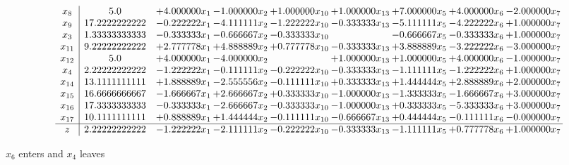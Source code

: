 \documentclass[10pt]{article}
\begin{document}
 \[\begin{array}{c| c c@{\hskip 2pt} c@{\hskip 2pt} c@{\hskip 2pt} c@{\hskip 2pt} c@{\hskip 2pt} c@{\hskip 2pt} c@{\hskip 2pt} }
 x_{8}   &  5.0 & + 4.000000 x_{1} & -1.000000 x_{2} & + 1.000000 x_{10} & + 1.000000 x_{13} & + 7.000000 x_{5} & + 4.000000 x_{6} & -2.000000 x_{7}\\
 x_{9}   &  17.2222222222 & -0.222222 x_{1} & -4.111111 x_{2} & -1.222222 x_{10} & -0.333333 x_{13} & -5.111111 x_{5} & -4.222222 x_{6} & + 1.000000 x_{7}\\
 x_{3}   &  1.33333333333 & -0.333333 x_{1} & -0.666667 x_{2} & -0.333333 x_{10} &   & -0.666667 x_{5} & -0.333333 x_{6} & + 1.000000 x_{7}\\
 x_{11}   &  9.22222222222 & + 2.777778 x_{1} & + 4.888889 x_{2} & + 0.777778 x_{10} & -0.333333 x_{13} & + 3.888889 x_{5} & -3.222222 x_{6} & -3.000000 x_{7}\\
 x_{12}   &  5.0 & + 4.000000 x_{1} & -4.000000 x_{2} &   & + 1.000000 x_{13} & + 1.000000 x_{5} & + 4.000000 x_{6} & -1.000000 x_{7}\\
 x_{4}   &  2.22222222222 & -1.222222 x_{1} & -0.111111 x_{2} & -0.222222 x_{10} & -0.333333 x_{13} & -1.111111 x_{5} & -1.222222 x_{6} & + 1.000000 x_{7}\\
 x_{14}   &  13.1111111111 & + 1.888889 x_{1} & -2.555556 x_{2} & -0.111111 x_{10} & + 0.333333 x_{13} & + 1.444444 x_{5} & + 2.888889 x_{6} & + 2.000000 x_{7}\\
 x_{15}   &  16.6666666667 & -1.666667 x_{1} & + 2.666667 x_{2} & + 0.333333 x_{10} & -1.000000 x_{13} & -1.333333 x_{5} & -1.666667 x_{6} & + 3.000000 x_{7}\\
 x_{16}   &  17.3333333333 & -0.333333 x_{1} & -2.666667 x_{2} & -0.333333 x_{10} & -1.000000 x_{13} & + 0.333333 x_{5} & -5.333333 x_{6} & + 3.000000 x_{7}\\
 x_{17}   &  10.1111111111 & + 0.888889 x_{1} & + 1.444444 x_{2} & -0.111111 x_{10} & -0.666667 x_{13} & + 0.444444 x_{5} & -0.111111 x_{6} & -0.000000 x_{7}\\
\hline
z    &  2.22222222222 & -1.222222 x_{1} & -2.111111 x_{2} & -0.222222 x_{10} & -0.333333 x_{13} & -1.111111 x_{5} & + 0.777778 x_{6} & + 1.000000 x_{7}\\
\end{array}\]


 $ x_{6} $ enters and $ x_{4} $ leaves 
\end{document}
